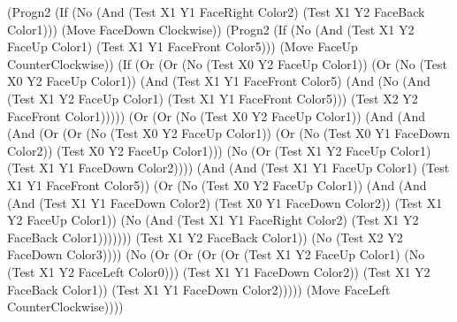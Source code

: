 (Progn2 (If (No (And (Test X1 Y1 FaceRight Color2) (Test X1 Y2 FaceBack Color1)))
(Move FaceDown Clockwise)) (Progn2 (If (No (And (Test X1 Y2 FaceUp Color1) (Test
X1 Y1 FaceFront Color5))) (Move FaceUp CounterClockwise)) (If (Or (Or (No (Test
X0 Y2 FaceUp Color1)) (Or (No (Test X0 Y2 FaceUp Color1)) (And (Test X1 Y1
FaceFront Color5) (And (No (And (Test X1 Y2 FaceUp Color1) (Test X1 Y1 FaceFront
Color5))) (Test X2 Y2 FaceFront Color1))))) (Or (Or (No (Test X0 Y2 FaceUp
Color1)) (And (And (And (Or (Or (No (Test X0 Y2 FaceUp Color1)) (Or (No (Test X0
Y1 FaceDown Color2)) (Test X0 Y2 FaceUp Color1))) (No (Or (Test X1 Y2 FaceUp
Color1) (Test X1 Y1 FaceDown Color2)))) (And (And (Test X1 Y1 FaceUp Color1)
(Test X1 Y1 FaceFront Color5)) (Or (No (Test X0 Y2 FaceUp Color1)) (And (And (And
(Test X1 Y1 FaceDown Color2) (Test X0 Y1 FaceDown Color2)) (Test X1 Y2 FaceUp
Color1)) (No (And (Test X1 Y1 FaceRight Color2) (Test X1 Y2 FaceBack
Color1))))))) (Test X1 Y2 FaceBack Color1)) (No (Test X2 Y2 FaceDown Color3))))
(No (Or (Or (Or (Or (Test X1 Y2 FaceUp Color1) (No (Test X1 Y2 FaceLeft Color0)))
(Test X1 Y1 FaceDown Color2)) (Test X1 Y2 FaceBack Color1)) (Test X1 Y1 FaceDown
Color2))))) (Move FaceLeft CounterClockwise))))
